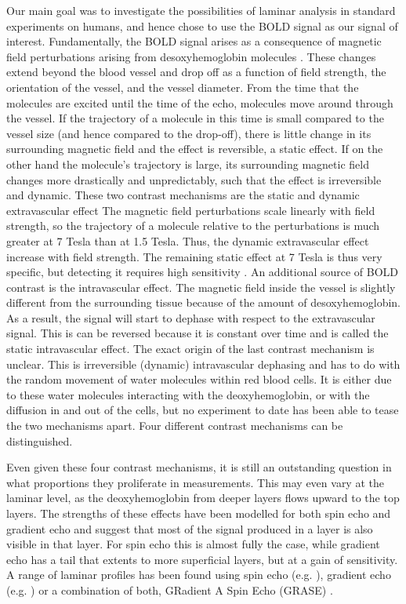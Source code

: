 Our main goal was to investigate the possibilities of laminar analysis in standard experiments on humans, and hence chose to use the BOLD signal as our signal of interest. Fundamentally, the BOLD signal arises as a consequence of magnetic field perturbations arising from desoxyhemoglobin molecules \cite{Norris2006}. These changes extend beyond the blood vessel and drop off as a function of field strength, the orientation of the vessel, and the vessel diameter. 
From the time that the molecules are excited until the time of the echo, molecules move around through the vessel. If the trajectory of a molecule in this time is small compared to the vessel size (and hence compared to the drop-off), there is little change in its surrounding magnetic field and the effect is reversible, a static effect. If on the other hand the molecule's trajectory is large, its surrounding magnetic field changes more drastically and unpredictably, such that the effect is irreversible and dynamic.
These two contrast mechanisms are the static and dynamic extravascular effect
The magnetic field perturbations scale linearly with field strength, so the trajectory of a molecule relative to the perturbations is much greater at 7 Tesla than at 1.5 Tesla. Thus, the dynamic extravascular effect increase with field strength. 
The remaining static effect at 7 Tesla is thus very specific, but detecting it requires high sensitivity \cite{Panchuelo2014}. 
An additional source of BOLD contrast is the intravascular effect. The magnetic field inside the vessel is slightly different from the surrounding tissue because of the amount of desoxyhemoglobin. As a result, the signal will start to dephase with respect to the extravascular signal. This is can be reversed because it is constant over time and is called the static intravascular effect. The exact origin of the last contrast mechanism is unclear. This is irreversible (dynamic) intravascular dephasing and has to do with the random movement of water molecules within red blood cells. It is either due to these water molecules interacting with the deoxyhemoglobin, or with the diffusion in and out of the cells, but no experiment to date has been able to tease the two mechanisms apart.
Four different contrast mechanisms can be distinguished.

Even given these four contrast mechanisms, it is still an outstanding question in what proportions they proliferate in measurements. This may even vary at the laminar level, as the deoxyhemoglobin from deeper layers flows upward to the top layers. The strengths of these effects have been modelled \cite{Markuerkiaga2016,Uludag2017} for both spin echo and gradient echo and suggest that most of the signal produced in a layer is also visible in that layer. For spin echo this is almost fully the case, while gradient echo has a tail that extents to more superficial layers, but at a gain of sensitivity. A range of laminar profiles has been found using spin echo (e.g. \cite{Zhao2004,Harel2006,Goense2006}), gradient echo (e.g. \cite{Polimeni2010,DeMartino2013,Chen2013}) or a combination of both, GRadient A Spin Echo (GRASE) \cite{Olman2012,DeMartino2013}.

